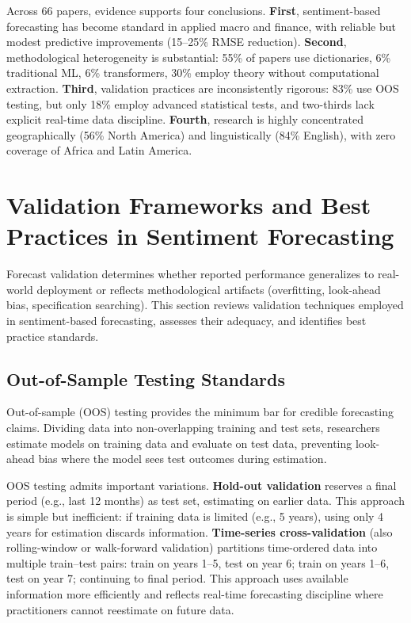 \documentclass[11pt,twocolumn]{article}
\begin{document}
Across 66 papers, evidence supports four conclusions. \textbf{First}, sentiment-based forecasting has become standard in applied macro and finance, with reliable but modest predictive improvements (15--25\% RMSE reduction). \textbf{Second}, methodological heterogeneity is substantial: 55\% of papers use dictionaries, 6\% traditional ML, 6\% transformers, 30\% employ theory without computational extraction. \textbf{Third}, validation practices are inconsistently rigorous: 83\% use OOS testing, but only 18\% employ advanced statistical tests, and two-thirds lack explicit real-time data discipline. \textbf{Fourth}, research is highly concentrated geographically (56\% North America) and linguistically (84\% English), with zero coverage of Africa and Latin America.

\section{Validation Frameworks and Best Practices in Sentiment Forecasting}

Forecast validation determines whether reported performance generalizes to real-world deployment or reflects methodological artifacts (overfitting, look-ahead bias, specification searching). This section reviews validation techniques employed in sentiment-based forecasting, assesses their adequacy, and identifies best practice standards.

\subsection{Out-of-Sample Testing Standards}

Out-of-sample (OOS) testing provides the minimum bar for credible forecasting claims. Dividing data into non-overlapping training and test sets, researchers estimate models on training data and evaluate on test data, preventing look-ahead bias where the model sees test outcomes during estimation.

OOS testing admits important variations. \textbf{Hold-out validation} reserves a final period (e.g., last 12 months) as test set, estimating on earlier data. This approach is simple but inefficient: if training data is limited (e.g., 5 years), using only 4 years for estimation discards information. \textbf{Time-series cross-validation} (also rolling-window or walk-forward validation) partitions time-ordered data into multiple train--test pairs: train on years 1--5, test on year 6; train on years 1--6, test on year 7; continuing to final period. This approach uses available information more efficiently and reflects real-time forecasting discipline where practitioners cannot reestimate on future data.
\end{document}
